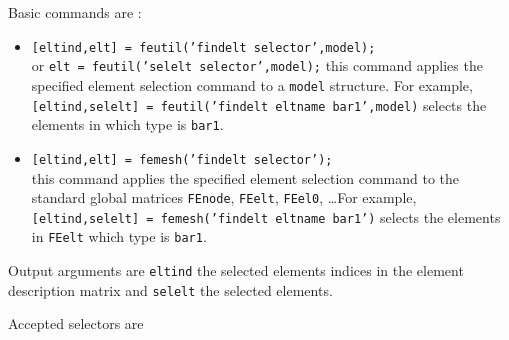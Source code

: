 Basic commands are : 
\begin{itemize}
\item {\tt [eltind,elt] = feutil('findelt selector',model);} \\or {\tt elt = feutil('selelt selector',model);} this command applies the specified element selection command to a {\tt model} structure. For example, \\
{\tt [eltind,selelt] = feutil('findelt eltname bar1',model)} selects the elements in  which type is {\tt bar1}.
\item {\tt [eltind,elt] = femesh('findelt selector');}\\
this command applies the specified element selection command to the standard global matrices {\tt FEnode}, {\tt FEelt}, {\tt FEel0}, \ldots For example, {\tt [eltind,selelt] = femesh('findelt eltname bar1')} selects the elements in {\tt FEelt} which type is {\tt bar1}.
\end{itemize}

Output arguments are {\tt eltind} the selected elements indices in the element description matrix and {\tt selelt} the selected elements.

Accepted selectors are

